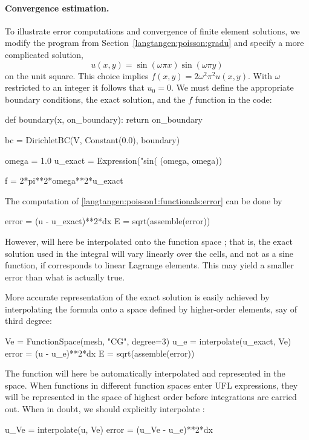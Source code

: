 \paragraph{Convergence estimation.}
To illustrate error computations and convergence of finite element
solutions, we modify the  program from
Section~\ref{langtangen:poisson:gradu} and specify a more complicated solution,
\[ u(x,y) = \sin(\omega\pi x)\sin(\omega\pi y)\]
on the unit square.  This choice implies $f(x,y)=2\omega^2\pi^2
u(x,y)$.  With $\omega$ restricted to an integer it follows that
$u_0=0$. We must define the appropriate boundary conditions, the exact
solution, and the $f$ function in the code:
\begin{python}
def boundary(x, on_boundary):
    return on_boundary

bc = DirichletBC(V, Constant(0.0), boundary)

omega = 1.0
u_exact = Expression("sin(%
                     (omega, omega))

f = 2*pi**2*omega**2*u_exact
\end{python}

The computation of \eqref{langtangen:poisson1:functionals:error} can be done by
\begin{python}
error = (u - u_exact)**2*dx
E = sqrt(assemble(error))
\end{python}
However,  will here be interpolated onto
the function space ; that is, the exact solution used in
the integral will vary linearly over
the cells, and not as a sine function,
if  corresponds to linear Lagrange elements.
This may yield a smaller error  than what is actually true.

More accurate representation of the exact solution is easily achieved
by interpolating the formula onto a space defined by higher-order
elements, say of third degree:
\begin{python}
Ve = FunctionSpace(mesh, "CG", degree=3)
u_e = interpolate(u_exact, Ve)
error = (u - u_e)**2*dx
E = sqrt(assemble(error))
\end{python}
The  function will here be
automatically interpolated and represented in the
 space. When functions in different
function spaces enter UFL expressions, they will be represented in the
space of highest order before integrations are carried out. When in
doubt, we should explicitly interpolate
:
\begin{python}
u_Ve = interpolate(u, Ve)
error = (u_Ve - u_e)**2*dx
\end{python}

